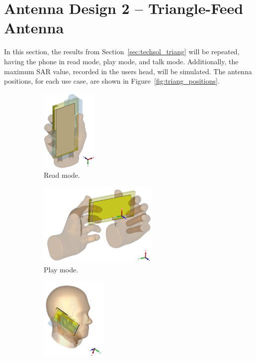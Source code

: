 \section{Antenna Design 2 -- Triangle-Feed Antenna}
In this section, the results from Section~\ref{sec:techsol_triang} will be repeated, having the phone in read mode, play mode, and talk mode. Additionally, the maximum SAR value, recorded in the users head, will be simulated. The antenna positions, for each use case, are shown in Figure~\ref{fig:triang_positions}.

\begin{figure}[htbp]
    \centering
    \begin{subfigure}[b]{0.24\linewidth}
        \centering
        \includegraphics[width=\linewidth,height=4cm,keepaspectratio]{img/tech_sol/trianglefeed/read_mode/3d.PNG}
        \caption{Read mode.}
    \end{subfigure}
    \begin{subfigure}[b]{0.24\linewidth}
        \centering
        \includegraphics[width=\linewidth,height=4cm,keepaspectratio]{img/tech_sol/trianglefeed/play_mode/3d.PNG}
        \caption{Play mode.}
    \end{subfigure}
    \begin{subfigure}[b]{0.24\linewidth}
        \centering
        \includegraphics[width=\linewidth,height=4cm,keepaspectratio]{img/tech_sol/trianglefeed/talk_mode/3d.PNG}

\end{subfigure}
\end{figure}
